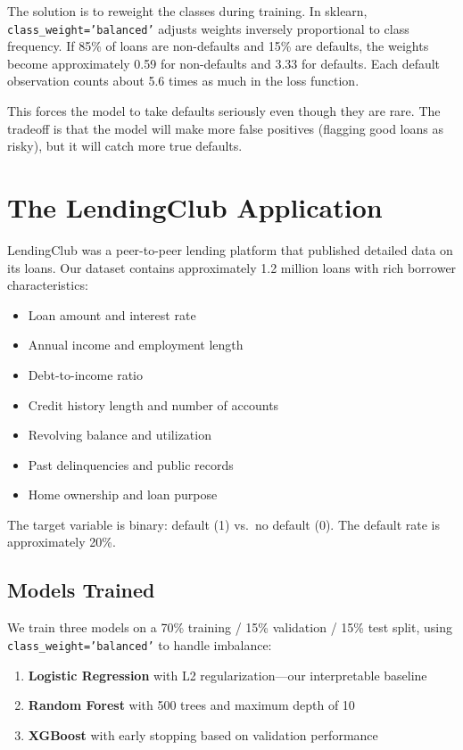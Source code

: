 \documentclass[11pt,a4paper]{article}
\begin{document}
The solution is to reweight the classes during training. In sklearn, \texttt{class\_weight='balanced'} adjusts weights inversely proportional to class frequency. If 85\% of loans are non-defaults and 15\% are defaults, the weights become approximately 0.59 for non-defaults and 3.33 for defaults. Each default observation counts about 5.6 times as much in the loss function.

This forces the model to take defaults seriously even though they are rare. The tradeoff is that the model will make more false positives (flagging good loans as risky), but it will catch more true defaults.

\section{The LendingClub Application}
LendingClub was a peer-to-peer lending platform that published detailed data on its loans. Our dataset contains approximately 1.2 million loans with rich borrower characteristics:
\begin{itemize}
    \item Loan amount and interest rate
    \item Annual income and employment length
    \item Debt-to-income ratio
    \item Credit history length and number of accounts
    \item Revolving balance and utilization
    \item Past delinquencies and public records
    \item Home ownership and loan purpose
\end{itemize}

The target variable is binary: default (1) vs.\ no default (0). The default rate is approximately 20\%.

\subsection{Models Trained}

We train three models on a 70\% training / 15\% validation / 15\% test split, using \texttt{class\_weight='balanced'} to handle imbalance:
\begin{enumerate}
    \item \textbf{Logistic Regression} with L2 regularization---our interpretable baseline
    \item \textbf{Random Forest} with 500 trees and maximum depth of 10
    \item \textbf{XGBoost} with early stopping based on validation performance
\end{enumerate}
\end{document}
